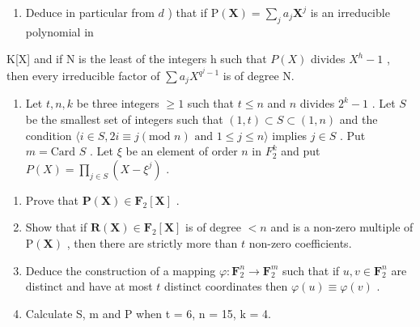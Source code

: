 \begin{enumerate}
\def\labelenumi{\alph{enumi})}
\setcounter{enumi}{4}
\tightlist
\item
  Deduce in particular from \(d\) ) that if \(\mathrm{P}(\mathbf{X}) = \sum_{j} a_j \mathbf{X}^j\) is an irreducible polynomial in
\end{enumerate}

K{[}X{]} and if N is the least of the integers h such that \(P(X)\) divides \(X^{h}-1\) , then every irreducible factor of \(\sum a_{j}X^{q^{j}-1}\) is of degree N.

\begin{enumerate}
\def\labelenumi{\arabic{enumi})}
\setcounter{enumi}{9}
\tightlist
\item
  Let \(t, n, k\) be three integers \(\geqslant 1\) such that \(t \leqslant n\) and \(n\) divides \(2^k - 1\) . Let \(S\) be the smallest set of integers such that \((1, t) \subset S \subset (1, n)\) and the condition \(\langle i \in S, 2i \equiv j (\text{mod } n) \text{ and } 1 \leqslant j \leqslant n \rangle\) implies \(j \in S\) . Put \(m = \text{Card } S\) . Let \(\xi\) be an element of order \(n\) in \(F_2^k\) and put \(P(X) = \prod_{j \in S} (X - \xi^j)\) .
\end{enumerate}

\begin{enumerate}
\def\labelenumi{\alph{enumi})}
\item
  Prove that \(\mathbf{P}(\mathbf{X})\in \mathbf{F}_2[\mathbf{X}]\) .
\item
  Show that if \(\mathbf{R}(\mathbf{X})\in \mathbf{F}_2[\mathbf{X}]\) is of degree \(< n\) and is a non-zero multiple of \(\mathrm{P}(\mathbf{X})\) , then there are strictly more than \(t\) non-zero coefficients.
\item
  Deduce the construction of a mapping \(\varphi: \mathbf{F}_2^n \to \mathbf{F}_2^m\) such that if \(u, v \in \mathbf{F}_2^n\) are distinct and have at most \(t\) distinct coordinates then \(\varphi(u) \equiv \varphi(v)\) .
\item
  Calculate S, m and P when t = 6, n = 15, k = 4.
\end{enumerate}

